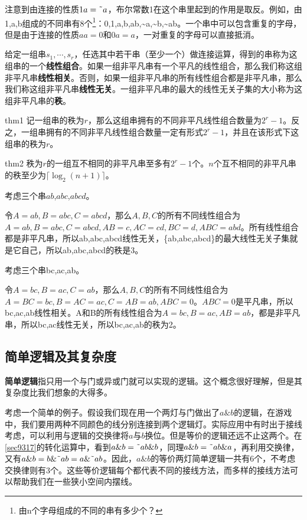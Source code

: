 注意到由连接的性质$1a=\textrm{\~{}} a$，布尔常数1在这个串里起到的作用是取反。例如，由1,a,b组成的不同串有8个\footnote{由n个字母组成的不同的串有多少个？}：0,1,a,b,ab,\~{}a,\~{}b,\~{}ab。一个串中可以包含重复的字母，但是由于连接的性质$aa=0$和$0a=a$，一对重复的字母可以直接抵消。

给定一组串$s_1,\cdots,s_r$，任选其中若干串（至少一个）做连接运算，得到的串称为这组串的一个\textbf{线性组合}。如果一组非平凡串有一个平凡的线性组合，那么我们称这组非平凡串\textbf{线性相关}。否则，如果一组非平凡串的所有线性组合都是非平凡串，那么我们称这组非平凡串\textbf{线性无关}。一组非平凡串的最大的线性无关子集的大小称为这组非平凡串的\textbf{秩}。
\begin{theorem}{}{thm1}
记一组串的秩为$r$，那么这组串拥有的不同非平凡线性组合数量为$2^r-1$。反之，一组串拥有的不同非平凡线性组合数量一定有形式$2^r-1$，并且在该形式下这组串的秩为$r$。
\end{theorem}
\begin{corollary}{}{thm2}
秩为$r$的一组互不相同的非平凡串至多有$2^r-1$个。$n$个互不相同的非平凡串的秩至少为$\lceil\log_2 (n+1)\rceil$。
\end{corollary}

\begin{example}
考虑三个串$ab$,$abc$,$abcd$。

令$A=ab,B=abc,C=abcd$，那么$A,B,C$的所有不同线性组合为$A=ab,B=abc,C=abcd,AB=c,AC=cd,BC=d,ABC=abd$。所有线性组合都是非平凡串，所以ab,abc,abcd线性无关，\{ab,abc,abcd\}的最大线性无关子集就是它自己，所以ab,abc,abcd的秩是3。
\end{example}

\begin{example}
考虑三个串bc,ac,ab。

令$A=bc,B=ac,C=ab$，那么$A,B,C$的所有不同线性组合为$A=BC=bc,B=AC=ac,C=AB=ab,ABC=0$。$ABC=0$是平凡串，所以bc,ac,ab线性相关。A和B的所有线性组合为$A=bc,B=ac,AB=ab$，都是非平凡串，所以bc,ac线性无关，所以bc,ac,ab的秩为2。
\end{example}

\subsection{简单逻辑及其复杂度}
\textbf{简单逻辑}指只用一个与门或异或门就可以实现的逻辑。这个概念很好理解，但是其复杂度比我们想象的大得多。

考虑一个简单的例子。假设我们现在用一个两灯与门做出了$a\&b$的逻辑，在游戏中，我们要用两种不同颜色的线分别连接到两个逻辑灯。实际应用中有时出于接线考虑，可以利用与逻辑的交换律将$a$与$b$换位。但是等价的逻辑还远不止这两个。在\autoref{sec9317}的转化运算中，看到$a\&b=\textrm{\~{}} ab\&b$，同理$a\&b=\textrm{\~{}} ab\&a$，再利用交换律，又有$a\&b=b\&\textrm{\~{}} ab=a\&\textrm{\~{}} ab$。因此，$a\&b$的等价两灯简单逻辑一共有6个，不考虑交换律则有3个。这些等价逻辑每个都代表不同的接线方法，而多样的接线方法可以帮助我们在一些狭小空间内摆线。

